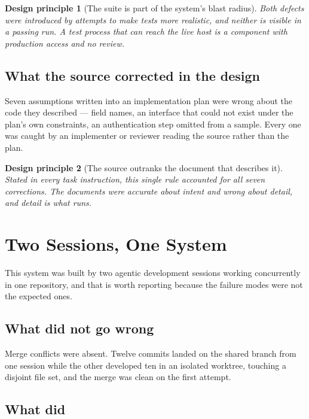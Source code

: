 \documentclass[11pt]{article}
\newtheorem{principle}{Design principle}
\begin{document}
\begin{principle}[The suite is part of the system's blast radius]
\label{prin:blast}
Both defects were introduced by attempts to make tests more realistic, and neither is visible in a passing run. A test process that can reach the live host is a component with production access and no review.
\end{principle}

\subsection{What the source corrected in the design}

Seven assumptions written into an implementation plan were wrong about the code they described --- field names, an interface that could not exist under the plan's own constraints, an authentication step omitted from a sample. Every one was caught by an implementer or reviewer reading the source rather than the plan.

\begin{principle}[The source outranks the document that describes it]
\label{prin:source}
Stated in every task instruction, this single rule accounted for all seven corrections. The documents were accurate about intent and wrong about detail, and detail is what runs.
\end{principle}

\section{Two Sessions, One System}
\label{sec:twosessions}

This system was built by two agentic development sessions working concurrently in one repository, and that is worth reporting because the failure modes were not the expected ones.

\subsection{What did not go wrong}

Merge conflicts were absent. Twelve commits landed on the shared branch from one session while the other developed ten in an isolated worktree, touching a disjoint file set, and the merge was clean on the first attempt.

\subsection{What did}
\end{document}
